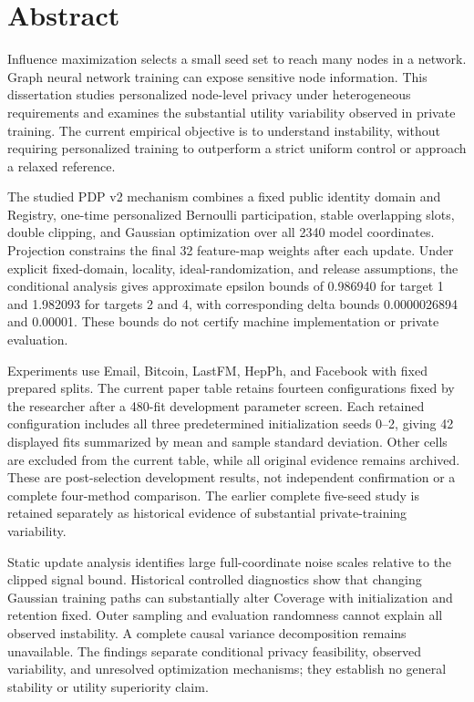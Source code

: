 \chapter*{Abstract}
Influence maximization selects a small seed set to reach many nodes in a network. Graph neural network training can expose sensitive node information. This dissertation studies personalized node-level privacy under heterogeneous requirements and examines the substantial utility variability observed in private training. The current empirical objective is to understand instability, without requiring personalized training to outperform a strict uniform control or approach a relaxed reference.

The studied PDP v2 mechanism combines a fixed public identity domain and Registry, one-time personalized Bernoulli participation, stable overlapping slots, double clipping, and Gaussian optimization over all 2340 model coordinates. Projection constrains the final 32 feature-map weights after each update. Under explicit fixed-domain, locality, ideal-randomization, and release assumptions, the conditional analysis gives approximate epsilon bounds of 0.986940 for target 1 and 1.982093 for targets 2 and 4, with corresponding delta bounds 0.0000026894 and 0.00001. These bounds do not certify machine implementation or private evaluation.

Experiments use Email, Bitcoin, LastFM, HepPh, and Facebook with fixed prepared splits. The current paper table retains fourteen configurations fixed by the researcher after a 480-fit development parameter screen. Each retained configuration includes all three predetermined initialization seeds 0--2, giving 42 displayed fits summarized by mean and sample standard deviation. Other cells are excluded from the current table, while all original evidence remains archived. These are post-selection development results, not independent confirmation or a complete four-method comparison. The earlier complete five-seed study is retained separately as historical evidence of substantial private-training variability.

Static update analysis identifies large full-coordinate noise scales relative to the clipped signal bound. Historical controlled diagnostics show that changing Gaussian training paths can substantially alter Coverage with initialization and retention fixed. Outer sampling and evaluation randomness cannot explain all observed instability. A complete causal variance decomposition remains unavailable. The findings separate conditional privacy feasibility, observed variability, and unresolved optimization mechanisms; they establish no general stability or utility superiority claim.
\clearpage
